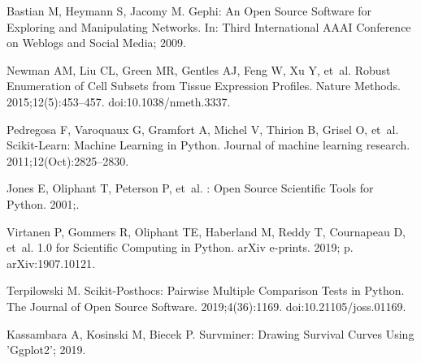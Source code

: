 \documentclass[10pt,letterpaper]{article}
\begin{document}
\begin{thebibliography}{10}
	Bastian M, Heymann S, Jacomy M.
	\newblock Gephi: An Open Source Software for Exploring and Manipulating
	Networks.
	\newblock In: Third International {{AAAI}} Conference on Weblogs and Social
	Media; 2009.
	
	Newman AM, Liu CL, Green MR, Gentles AJ, Feng W, Xu Y, et~al.
	\newblock Robust Enumeration of Cell Subsets from Tissue Expression Profiles.
	\newblock Nature Methods. 2015;12(5):453--457.
	\newblock doi:{10.1038/nmeth.3337}.
	
	Pedregosa F, Varoquaux G, Gramfort A, Michel V, Thirion B, Grisel O, et~al.
	\newblock Scikit-Learn: Machine Learning in Python.
	\newblock Journal of machine learning research. 2011;12(Oct):2825--2830.
	
	Jones E, Oliphant T, Peterson P, et~al.
	: {{Open}} Source Scientific Tools for {{Python}}. 2001;.
	
	Virtanen P, Gommers R, Oliphant TE, Haberland M, Reddy T, Cournapeau D, et~al.
	 1.0 for {{Scientific
			Computing}} in {{Python}}.
	\newblock arXiv e-prints. 2019; p. arXiv:1907.10121.
	
	Terpilowski M.
	\newblock Scikit-Posthocs: {{Pairwise}} Multiple Comparison Tests in
	{{Python}}.
	\newblock The Journal of Open Source Software. 2019;4(36):1169.
	\newblock doi:{10.21105/joss.01169}.
	
	Kassambara A, Kosinski M, Biecek P.
	\newblock Survminer: Drawing Survival Curves Using 'Ggplot2'; 2019.
	
\end{thebibliography}
\end{document}
